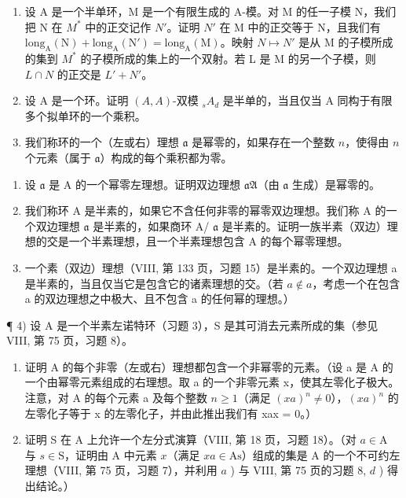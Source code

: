 
\begin{enumerate}
\def\labelenumi{\arabic{enumi})}
\item
  设 A 是一个半单环，M 是一个有限生成的 A-模。对 M 的任一子模 N，我们把 N 在 \(M^{*}\) 中的正交记作 \(N'\)。证明 \(N'\) 在 M 中的正交等于 N，且我们有 \(\text{long}_{\text{A}}(\text{N}) + \text{long}_{\text{A}}(\text{N}') = \text{long}_{\text{A}}(\text{M})\)。映射 \(N \mapsto N'\) 是从 M 的子模所成的集到 \(M^{*}\) 的子模所成的集上的一个双射。若 L 是 M 的另一个子模，则 \(L \cap N\) 的正交是 \(L' + N'\)。
\item
  设 A 是一个环。证明 \((A,A)\)-双模 \(_{s}A_{d}\) 是半单的，当且仅当 A 同构于有限多个拟单环的一个乘积。
\item
  我们称环的一个（左或右）理想 \(\mathfrak{a}\) 是幂零的，如果存在一个整数 \(n\)，使得由 \(n\) 个元素（属于 \(\mathfrak{a}\)）构成的每个乘积都为零。
\end{enumerate}

\begin{enumerate}
\def\labelenumi{\alph{enumi})}
\item
  设 \(\mathfrak{a}\) 是 A 的一个幂零左理想。证明双边理想 \(\mathfrak{aA}\)（由 \(\mathfrak{a}\) 生成）是幂零的。
\item
  我们称环 A 是半素的，如果它不含任何非零的幂零双边理想。我们称 A 的一个双边理想 \(\mathfrak{a}\) 是半素的，如果商环 A/ \(\mathfrak{a}\) 是半素的。证明一族半素（双边）理想的交是一个半素理想，且一个半素理想包含 A 的每个幂零理想。
\item
  一个素（双边）理想（VIII, 第 133 页，习题 15）是半素的。一个双边理想 a 是半素的，当且仅当它是包含它的诸素理想的交。（若 \(a \notin a\)，考虑一个在包含 a 的双边理想之中极大、且不包含 a 的任何幂的理想。）
\end{enumerate}

¶ 4) 设 A 是一个半素左诺特环（习题 3），S 是其可消去元素所成的集（参见 VIII, 第 75 页，习题 8）。

\begin{enumerate}
\def\labelenumi{\alph{enumi})}
\item
  证明 A 的每个非零（左或右）理想都包含一个非幂零的元素。（设 a 是 A 的一个由幂零元素组成的右理想。取 a 的一个非零元素 x，使其左零化子极大。注意，对 A 的每个元素 a 及每个整数 \(n \geqslant 1\)（满足 \((xa)^{n} \neq 0\)），\((xa)^{n}\) 的左零化子等于 x 的左零化子，并由此推出我们有 xax = 0。）
\item
  证明 S 在 A 上允许一个左分式演算（VIII, 第 18 页，习题 18）。（对 \(a \in \mathrm{A}\) 与 \(s \in \mathrm{S}\)，证明由 A 中元素 \(x\)（满足 \(xa \in \mathrm{As}\)）组成的集是 A 的一个不可约左理想（VIII, 第 75 页，习题 7），并利用 \(a\) ) 与 VIII, 第 75 页的习题 8, \(d\) ) 得出结论。）
\end{enumerate}

